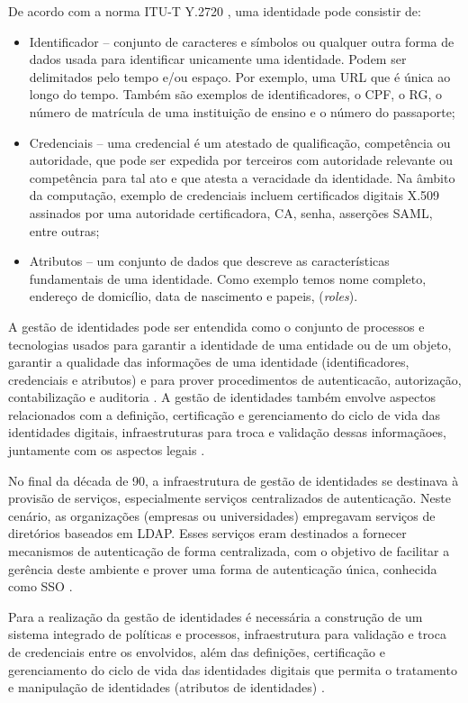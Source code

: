 De acordo com a norma ITU-T Y.2720 \cite{itut:09}, uma identidade pode consistir de:

\begin{itemize}
 \item Identificador -- conjunto de caracteres e símbolos ou qualquer outra forma de dados usada para identificar unicamente uma identidade. Podem ser delimitados pelo tempo e/ou espaço. Por exemplo, uma \ac{URL} que é única ao longo do tempo. Também são exemplos de identificadores, o CPF, o  RG, o número de matrícula de uma instituição de ensino e o número do passaporte;
 \item Credenciais -- uma credencial é um atestado de qualificação, competência ou autoridade, que pode ser expedida por terceiros com autoridade relevante ou competência para tal ato e que atesta a veracidade da identidade. Na âmbito da computação, exemplo  de credenciais incluem certificados digitais X.509 assinados por uma autoridade certificadora, \ac{CA}, senha, asserções \ac{SAML}, entre outras;
 \item Atributos -- um conjunto de dados que descreve as características fundamentais de uma identidade. Como exemplo temos nome completo, endereço de domicílio, data de nascimento e papeis, (\textit{roles}).
\end{itemize}

A gestão de identidades pode ser entendida como o conjunto de processos e tecnologias usados para garantir a identidade de uma entidade ou de um objeto, garantir a qualidade das informações de uma identidade (identificadores, credenciais e atributos) e para prover procedimentos de autenticacão, autorização, contabilização e auditoria \cite{itut:09}. A gestão de identidades também envolve aspectos relacionados com a definição, certificação e gerenciamento do ciclo de vida das identidades digitais, infraestruturas para troca e validação dessas informaçãoes, juntamente com os aspectos legais \cite{pope:05, chadwick:09}.

No final da década de 90, a infraestrutura de gestão de identidades se destinava à provisão de serviços, especialmente serviços centralizados de autenticação. Neste cenário, as organizações (empresas ou universidades) empregavam serviços de diretórios baseados em \ac{LDAP}. Esses serviços eram destinados a fornecer mecanismos de autenticação de forma centralizada, com o objetivo de facilitar a gerência deste ambiente e prover uma forma de autenticação única, conhecida como \acf{SSO} \cite{suess:09}.

Para a realização da gestão de identidades é necessária a construção de um sistema integrado de políticas e processos, infraestrutura para validação e troca de credenciais entre os envolvidos, além das definições, certificação e gerenciamento do ciclo de vida das identidades digitais que permita o tratamento e manipulação de identidades (atributos de identidades) \cite{josan:05, chadwick:09}.

